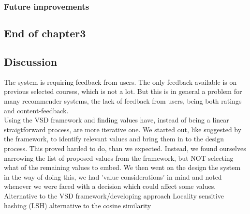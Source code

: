 \subsubsection{Future improvements} %
\label{sub:future_improvements}



\subsection{End of chapter3} %
\label{sub:end_of_chapter3}

\subsection{Discussion}
The system is requiring feedback from users. The only feedback available is on previous selected courses, which is not a lot. But this is in general a problem for many recommender systems, the lack of feedback from users, being both ratings and content-feedback.\\
Using the VSD framework and finding values have, instead of being a linear straigtforward process, are more iterative one. We started out, like suggested by the framework, to identify relevant values and bring them in to the design process. This proved harded to do, than we expected. Instead, we found ourselves narrowing the list of proposed values from the framework, but NOT selecting what of the remaining values to embed. We then went on the design the system in the way of doing this, we had 'value considerations' in mind and noted whenever we were faced with a decision which could affect some values. \\
Alternative to the VSD framework/developing approach
Locality sensitive hashing (LSH) alternative to the cosine similarity 